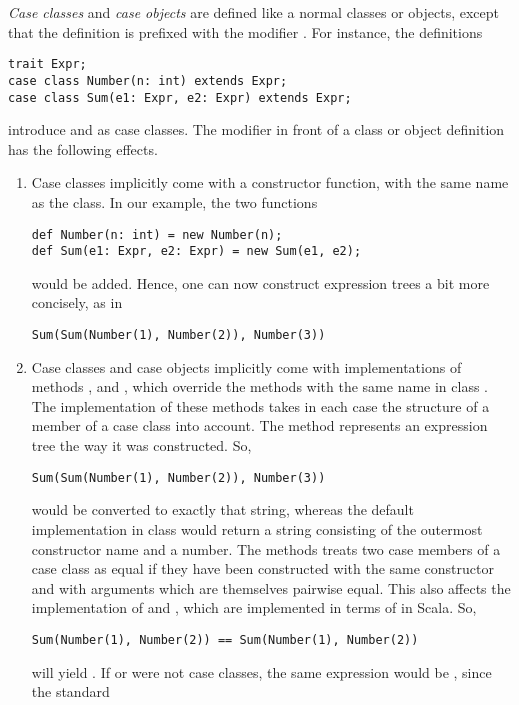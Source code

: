 {\em Case classes} and {\em case objects} are defined like a normal
classes or objects, except that the definition is prefixed with the modifier
.  For instance, the definitions
\begin{lstlisting}
trait Expr;
case class Number(n: int) extends Expr;
case class Sum(e1: Expr, e2: Expr) extends Expr;
\end{lstlisting}
introduce  and  as case classes.
The  modifier in front of a class or object 
definition has the following effects.
\begin{enumerate}
\item Case classes implicitly come with a constructor function, with the same name as the class. In our example, the two functions
\begin{lstlisting}
def Number(n: int) = new Number(n);
def Sum(e1: Expr, e2: Expr) = new Sum(e1, e2);
\end{lstlisting}
would be added. Hence, one can now construct expression trees a bit more concisely, as in
\begin{lstlisting}
Sum(Sum(Number(1), Number(2)), Number(3))
\end{lstlisting} 
\item Case classes and case objects 
implicitly come with implementations of methods
,  and , which override the
methods with the same name in class . The implementation
of these methods takes in each case the structure of a member of a
case class into account. The  method represents an
expression tree the way it was constructed. So,
\begin{lstlisting}
Sum(Sum(Number(1), Number(2)), Number(3))
\end{lstlisting} 
would be converted to exactly that string, whereas the default
implementation in class  would return a string consisting
of the outermost constructor name  and a number.  The
 methods treats two case members of a case class as equal
if they have been constructed with the same constructor and with
arguments which are themselves pairwise equal. This also affects the
implementation of \code{==} and \code{!=}, which are implemented in
terms of  in Scala. So,
\begin{lstlisting}
Sum(Number(1), Number(2)) == Sum(Number(1), Number(2))
\end{lstlisting}
will yield . If  or  were not case
classes, the same expression would be , since the standard

\end{enumerate}
